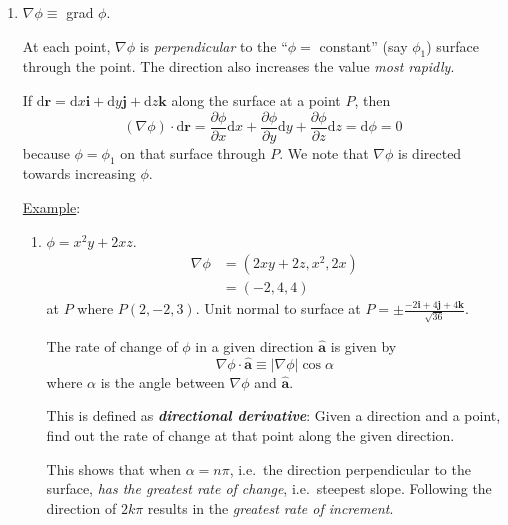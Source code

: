 \documentclass[12pt]{report}
\theoremstyle{definition}
\begin{document}
\begin{enumerate}[label = (\arabic*)]
    \item $\nabla\phi\equiv$ grad $\phi$.

        At each point, $\nabla\phi$ is \emph{perpendicular} to the 
        ``$\phi =$ constant'' (say $\phi_1$) surface through the point.
        The direction also increases the value \emph{most rapidly}.

        If $\mathrm{d}\mathbf{r} = \mathrm{d}x\mathbf{i}
        + \mathrm{d}y\mathbf{j} + \mathrm{d}z\mathbf{k}$
        along the surface at a point $P$, then\[
            (\nabla\phi)\cdot\mathrm{d}\mathbf{r} = 
            \frac{\partial\phi}{\partial x}\mathrm{d}x + \frac{\partial\phi}{\partial y}\mathrm{d}y
            + \frac{\partial\phi}{\partial z}\mathrm{d}z = \mathrm{d}\phi = 0
        \]because $\phi = \phi_1$ on that surface through $P$.
        We note that $\nabla\phi$ is directed towards increasing $\phi$.

        \medskip
        \underline{Example}: 

        \begin{enumerate}[label = (\alph*)]
            \item $\phi = x^{2}y + 2xz$.
                \[
                    \begin{align*}
                        \nabla\phi & = (2xy + 2z, x^{2}, 2x) \\
                                   & = (-2, 4, 4)
                    \end{align*}
                \]at $P$ where $P(2, -2, 3)$.
                Unit normal to surface at $P = \pm \frac{-2\mathbf{i} + 4\mathbf{j} + 4\mathbf{k}}{\sqrt{36}}$.
    
                The rate of change of $\phi$ in a given direction $\hat{\mathbf{a}}$
                is given by\[
                    \nabla\phi\cdot\hat{\mathbf{a}} \equiv |\nabla\phi|\cos{\alpha}
                \]where $\alpha$ is the angle between $\nabla\phi$ and $\hat{\mathbf{a}}$.
                
                This is defined as \textbf{\emph{directional derivative}}: Given a
                direction and a point, find out the rate of change at that point
                along the given direction.

                This shows that when $\alpha = n\pi$, i.e.\ 
                the direction perpendicular to the surface,
                \emph{has the greatest rate of change}, i.e.\ steepest slope.
                Following the direction of $2k\pi$ results in the 
                \emph{greatest rate of increment}.


\end{enumerate}
\end{enumerate}
\end{document}
